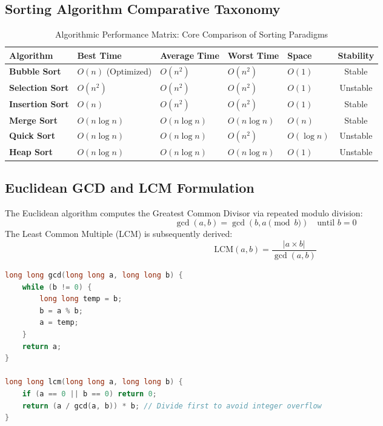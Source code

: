 \subsection{Sorting Algorithm Comparative Taxonomy}
\begin{table}[htbp]
\centering
\small
\begin{tabularx}{\textwidth}{l X X X X c}
\toprule
\textbf{Algorithm} & \textbf{Best Time} & \textbf{Average Time} & \textbf{Worst Time} & \textbf{Space} & \textbf{Stability} \\
\midrule
\textbf{Bubble Sort} & $O(n)$ (Optimized) & $O(n^2)$ & $O(n^2)$ & $O(1)$ & Stable \\
\textbf{Selection Sort} & $O(n^2)$ & $O(n^2)$ & $O(n^2)$ & $O(1)$ & Unstable \\
\textbf{Insertion Sort} & $O(n)$ & $O(n^2)$ & $O(n^2)$ & $O(1)$ & Stable \\
\textbf{Merge Sort} & $O(n \log n)$ & $O(n \log n)$ & $O(n \log n)$ & $O(n)$ & Stable \\
\textbf{Quick Sort} & $O(n \log n)$ & $O(n \log n)$ & $O(n^2)$ & $O(\log n)$ & Unstable \\
\textbf{Heap Sort} & $O(n \log n)$ & $O(n \log n)$ & $O(n \log n)$ & $O(1)$ & Unstable \\
\bottomrule
\end{tabularx}
\caption{Algorithmic Performance Matrix: Core Comparison of Sorting Paradigms}
\label{tab:sorting_comparison}
\end{table}

\subsection{Euclidean GCD and LCM Formulation}
The Euclidean algorithm computes the Greatest Common Divisor via repeated modulo division:
\[
\gcd(a, b) = \gcd(b, a \pmod b) \quad \text{until } b = 0
\]
The Least Common Multiple (LCM) is subsequently derived:
\[
\text{LCM}(a, b) = \frac{|a \times b|}{\gcd(a, b)}
\]

\begin{lstlisting}[language=C]
long long gcd(long long a, long long b) {
    while (b != 0) {
        long long temp = b;
        b = a % b;
        a = temp;
    }
    return a;
}

long long lcm(long long a, long long b) {
    if (a == 0 || b == 0) return 0;
    return (a / gcd(a, b)) * b; // Divide first to avoid integer overflow
}
\end{lstlisting}

